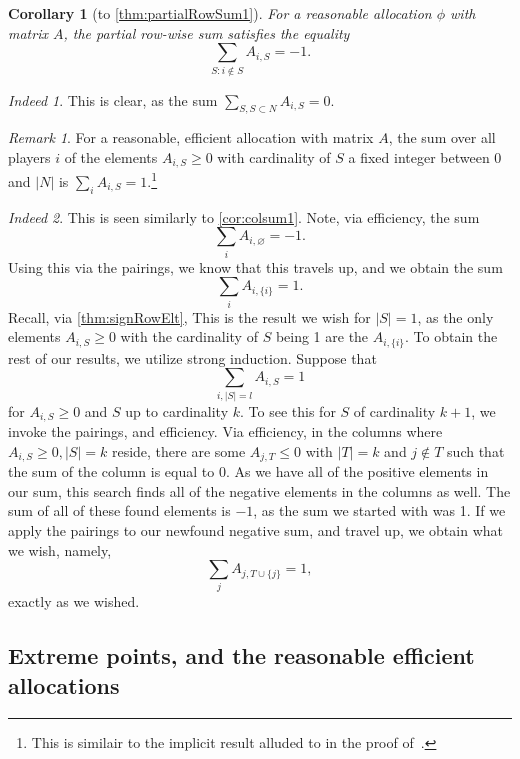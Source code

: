 \documentclass[12pt,letterpaper,final]{article}
\theoremstyle{plain}
\theoremstyle{plain}
\theoremstyle{plain}
\theoremstyle{plain}
\theoremstyle{plain}
\newtheorem*{corollary}{Corollary}
\theoremstyle{plain}
\theoremstyle{plain}
\theoremstyle{definition}
\theoremstyle{definition}
\theoremstyle{definition}
\theoremstyle{definition}
\theoremstyle{definition}
\theoremstyle{remark}
\newtheorem*{remark}{Remark}
\theoremstyle{remark}
\theoremstyle{remark}
\theoremstyle{remark}
\newtheorem*{indeed}{Indeed}
\begin{document}
\begin{corollary}[to \cref{thm:partialRowSum1}]
  For a reasonable allocation \(\phi\) with matrix \(A\), the
  partial row-wise sum satisfies the equality
  \[
    \sum_{S: i\notin S} A_{i,S} = -1.
  \]
\end{corollary}

\begin{indeed}
  This is clear, as the sum \(\sum_{S, S\subset N} A_{i,S} = 0\).
\end{indeed}

\begin{remark}
  For a reasonable, efficient allocation with matrix \(A\), the sum over all
  players \(i\) of the elements \(A_{i,S} \geq 0\) with cardinality of
  \(S\) a fixed integer between 0 and \(|N|\) is
  \(\sum_i A_{i,S} = 1\).\footnote{This is similair to the
    implicit result alluded to in the proof of~\cite[Theorem
    13]{Weber78}.}
\end{remark}

\begin{indeed}
  This is seen similarly to \cref{cor:colsum1}. Note, via efficiency,
  the sum
  \[
    \sum_{i} A_{i,\varnothing} = -1.
  \]
  Using this via the pairings, we know that this travels up, and we
  obtain the sum
  \[
    \sum_i A_{i,\{i\}} = 1.
  \]
  Recall, via \cref{thm:signRowElt}, This is the result we wish for
  \(|S|=1\), as the only elements \(A_{i,S}\geq 0\) with the
  cardinality of \(S\) being 1 are the \(A_{i,\{i\}}\). To obtain the
  rest of our results, we utilize strong induction. Suppose that
  \[
    \sum_{i,|S|=l} A_{i,S} = 1
  \]
  for \(A_{i,S}\geq 0\) and \(S\) up to cardinality \(k\). To see this
  for \(S\) of cardinality \(k+1\), we invoke the pairings, and
  efficiency. Via efficiency, in the columns where
  \(A_{i,S}\geq 0, |S|=k\) reside, there are some \(A_{j,T}\leq 0\)
  with \(|T|=k\) and \(j\notin T\) such that the sum of the column is
  equal to 0. As we have all of the positive elements in our sum, this
  search finds all of the negative elements in the columns as
  well. The sum of all of these found elements is \(-1\), as the sum
  we started with was 1. If we apply the pairings to our newfound
  negative sum, and travel up, we obtain what we wish, namely,
  \[
    \sum_j A_{j,T\cup\{j\}}=1,
  \]
  exactly as we wished.
\end{indeed}

\subsection{Extreme points, and the reasonable efficient allocations}
\end{document}
